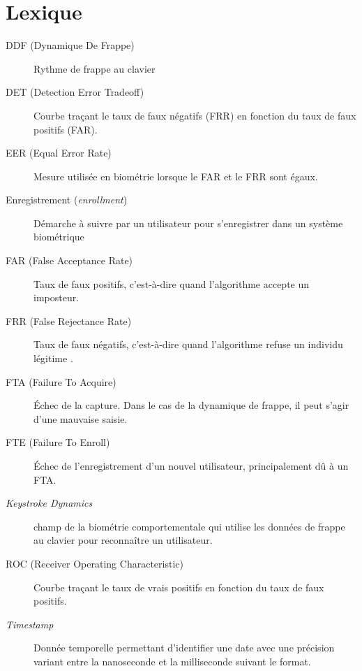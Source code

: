 \section{Lexique}

\begin{description}
  \item[DDF (Dynamique De Frappe)] Rythme de frappe au clavier
  \item[DET (Detection Error Tradeoff)] Courbe traçant le taux de faux négatifs (FRR) en fonction du taux de faux positifs (FAR).
  \item[EER (Equal Error Rate)] Mesure utilisée en biométrie lorsque le FAR et le FRR sont égaux.
  \item[Enregistrement (\textit{enrollment})] Démarche à suivre par un utilisateur pour s'enregistrer dans un système biométrique
  \item[FAR (False Acceptance Rate)] Taux de faux positifs, c'est-à-dire quand l'algorithme accepte un imposteur.
  \item[FRR (False Rejectance Rate)] Taux de faux négatifs, c'est-à-dire quand l'algorithme refuse un individu légitime .
  \item[FTA (Failure To Acquire)] Échec de la capture. Dans le cas de la dynamique de frappe, il peut s'agir d'une mauvaise saisie.
  \item[FTE (Failure To Enroll)] Échec de l'enregistrement d'un nouvel utilisateur, principalement dû à un FTA.
  \item[\textit{Keystroke Dynamics}] champ de la biométrie comportementale qui utilise les données de frappe au clavier pour reconnaître un utilisateur.
  \item[ROC (Receiver Operating Characteristic)] Courbe traçant le taux de vrais positifs en fonction du taux de faux positifs.
  \item[\textit{Timestamp}] Donnée temporelle permettant d'identifier une date avec une précision variant entre la nanoseconde et la milliseconde suivant le format.
\end{description}
